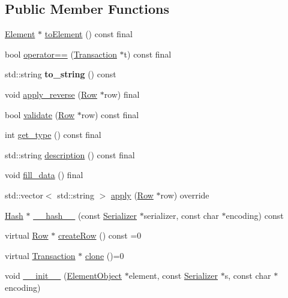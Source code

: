 \subsection*{Public Member Functions}
\begin{DoxyCompactItemize}
\item 
\mbox{\hyperlink{classElement}{Element}} $\ast$ \mbox{\hyperlink{classReward_a0ecd536148463880f9980fe415b6eb1d}{to\+Element}} () const final
\item 
bool \mbox{\hyperlink{classReward_ab2cd65f16c670e3e9d8cfe84a6dc56cb}{operator==}} (\mbox{\hyperlink{classTransaction}{Transaction}} $\ast$t) const final
\item 
\mbox{\label{classReward_a0d65cd39eb260091d1f2cf19e2e71de7}} 
std\+::string {\bfseries to\+\_\+string} () const
\item 
void \mbox{\hyperlink{classReward_a494c9d6e0a220729f675fd6131cfb9af}{apply\+\_\+reverse}} (\mbox{\hyperlink{classRow}{Row}} $\ast$row) final
\item 
bool \mbox{\hyperlink{classReward_a9c9a3219ba6b8b068f7f1cccc779b1b5}{validate}} (\mbox{\hyperlink{classRow}{Row}} $\ast$row) const final
\item 
int \mbox{\hyperlink{classReward_a1d3d05263d54771a314927d09585968c}{get\+\_\+type}} () const final
\item 
std\+::string \mbox{\hyperlink{classReward_a95e98fc9dbbc9da47cee243adc1932d2}{description}} () const final
\item 
void \mbox{\hyperlink{classReward_a30a40e2eefd0aea969fab46d1e22d145}{fill\+\_\+data}} () final
\item 
std\+::vector$<$ std\+::string $>$ \mbox{\hyperlink{classReward_aae55ec2aa2aa31cc365c80cb42be9ab5}{apply}} (\mbox{\hyperlink{classRow}{Row}} $\ast$row) override
\item 
\mbox{\hyperlink{classHash}{Hash}} $\ast$ \mbox{\hyperlink{classTransaction_a1f0df166c34d6a38a991544cf98c0356}{\+\_\+\+\_\+hash\+\_\+\+\_\+}} (const \mbox{\hyperlink{classSerializer}{Serializer}} $\ast$serializer, const char $\ast$encoding) const
\item 
virtual \mbox{\hyperlink{classRow}{Row}} $\ast$ \mbox{\hyperlink{classTransaction_aa80b621537fe480dcb4444bba703abe5}{create\+Row}} () const =0
\item 
virtual \mbox{\hyperlink{classTransaction}{Transaction}} $\ast$ \mbox{\hyperlink{classTransaction_ad6ee9c5e4067b2f5c950c6aad131b3e4}{clone}} ()=0
\item 
void \mbox{\hyperlink{classComponent_a28212595f8ee85fe009bd233bc99b2fc}{\+\_\+\+\_\+init\+\_\+\+\_\+}} (\mbox{\hyperlink{classElementObject}{Element\+Object}} $\ast$element, const \mbox{\hyperlink{classSerializer}{Serializer}} $\ast$s, const char $\ast$encoding)
\end{DoxyCompactItemize}
